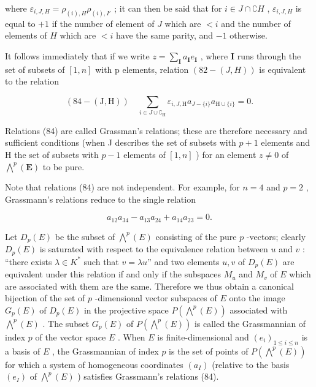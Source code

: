 where \(\varepsilon_{i,J,H} = \rho_{(i),H}\rho_{(i),I'}\) ; it can then be said that for \(i\in J\cap \complement H\) , \(\varepsilon_{i,J,H}\) is equal to \(+1\) if the number of element of \(J\) which are \(< i\) and the number of elements of \(H\) which are \(< i\) have the same parity, and \(-1\) otherwise.

It follows immediately that if we write \(z = \sum_{\mathbf{I}} a_{\mathbf{I}} e_{\mathbf{I}}\) , where \(\mathbf{I}\) runs through the set of subsets of \([1, n]\) with p elements, relation \((82-(J, H))\) is equivalent to the relation

\[
(84 - (\mathrm{J}, \mathrm{H})) \quad \sum_ {i \in J \cup \complement_ {\mathrm{H}}} \varepsilon_ {i, J, \mathrm{H}} a _ {J - \{i \}} a _ {\mathrm{H} \cup \{i \}} = 0.
\]

Relations (84) are called Grassman's relations; these are therefore necessary and sufficient conditions (when J describes the set of subsets with \(p + 1\) elements and H the set of subsets with \(p - 1\) elements of \([1, n]\) ) for an element \(z \neq 0\) of \(\bigwedge^{p}(\mathbf{E})\) to be pure.

Note that relations (84) are not independent. For example, for \(n = 4\) and \(p = 2\) , Grassmann's relations reduce to the single relation

\[
a _ {1 2} a _ {3 4} - a _ {1 3} a _ {2 4} + a _ {1 4} a _ {2 3} = 0.\tag{85}
\]

Let \(D_p(E)\) be the subset of \(\bigwedge^p(E)\) consisting of the pure \(p\) -vectors; clearly \(D_p(E)\) is saturated with respect to the equivalence relation between \(u\) and \(v\) : ``there exists \(\lambda \in K^*\) such that \(v = \lambda u\)'' and two elements \(u, v\) of \(D_p(E)\) are equivalent under this relation if and only if the subspaces \(M_u\) and \(M_v\) of \(E\) which are associated with them are the same. Therefore we thus obtain a canonical bijection of the set of \(p\) -dimensional vector subspaces of \(E\) onto the image \(G_p(E)\) of \(D_p(E)\) in the projective space \(P(\bigwedge^p(E))\) associated with \(\bigwedge^p(E)\) . The subset \(G_p(E)\) of \(P(\bigwedge^p(E))\) is called the Grassmannian of index \(p\) of the vector space \(E\) . When \(E\) is finite-dimensional and \((e_i)_{1 \leq i \leq n}\) is a basis of \(E\) , the Grassmannian of index \(p\) is the set of points of \(P(\bigwedge^p(E))\) for which a system of homogeneous coordinates \((a_I)\) (relative to the basis \((e_I)\) of \(\bigwedge^p(E)\) ) satisfies Grassmann's relations (84).

